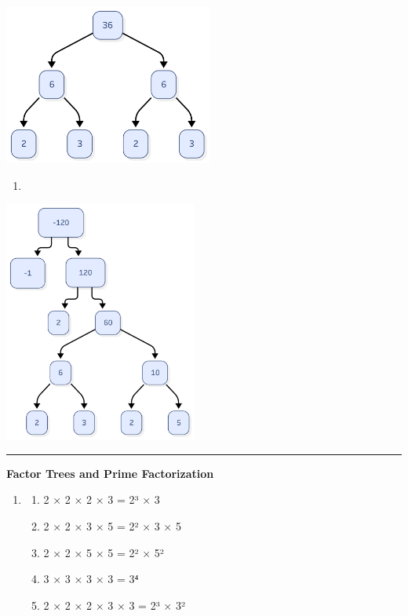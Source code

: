 \documentclass[
  letterpaper,
  DIV=11,
  numbers=noendperiod]{scrreprt}
\providecommand{\tightlist}{%
  \setlength{\itemsep}{0pt}\setlength{\parskip}{0pt}}
\begin{document}
\includegraphics[width=\linewidth,height=2.08333in,keepaspectratio]{images/Unit_1/Lesson_2/lesson_1_2_4a.png}

\begin{enumerate}
\def\labelenumi{\alph{enumi}.}
\setcounter{enumi}{1}
\tightlist
\item
\end{enumerate}

\includegraphics[width=\linewidth,height=3.125in,keepaspectratio]{images/Unit_1/Lesson_2/lesson_1_2_4b.png}

\begin{center}\rule{0.5\linewidth}{0.5pt}\end{center}

\textbf{Factor Trees and Prime Factorization}

\begin{enumerate}
\def\labelenumi{\arabic{enumi}.}
\setcounter{enumi}{4}
\tightlist
\item
  \begin{enumerate}
  \def\labelenumii{\alph{enumii}.}
  \tightlist
  \item
    2 × 2 × 2 × 3 = 2³ × 3
  \item
    2 × 2 × 3 × 5 = 2² × 3 × 5
  \item
    2 × 2 × 5 × 5 = 2² × 5²
  \item
    3 × 3 × 3 × 3 = 3⁴
  \item
    2 × 2 × 2 × 3 × 3 = 2³ × 3²
  \end{enumerate}
\end{enumerate}
\end{document}
